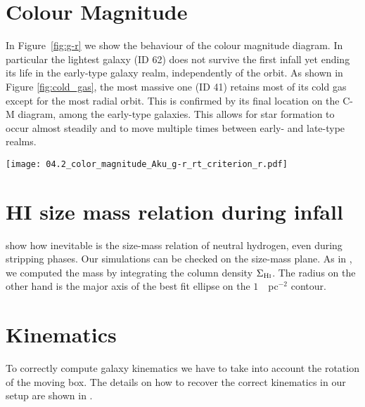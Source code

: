 \section{Colour Magnitude}
In Figure~\ref{fig:g-r} we show the behaviour of the colour magnitude diagram.
In particular the lightest galaxy (ID 62) does not survive the first infall yet ending its life in the early-type galaxy realm, independently of the orbit.
As shown in Figure \ref{fig:cold_gas}, the most massive one (ID 41) retains most of its cold gas except for the most radial orbit.
This is confirmed by its final location on the C-M diagram, among the early-type galaxies.
This allows for star formation to occur almost steadily and to move multiple times between early- and late-type realms.


\begin{sidewaysfigure}
\centering
\texttt{[image: 04.2\_color\_magnitude\_Aku\_g-r\_rt\_criterion\_r.pdf]}
\caption{SDSS bands colour magnitude diagram of galaxies on different orbits compared to Fornax dwarf catalogue of \citet{Venhola2019}.
Red and blue colour for the data points in the background represent dwarf elliptical (dE) and late type galaxy respectively, classified by eye on the base of morphology.
Empty squares are nucleated dE.
Data tracks of simulated galaxies are shown overlaid colour coded by the clustercentric radius.
The tracks are limited to bound galaxies i.e. they are drawn with snapshots for which condition \eqref{eq:tidal_radius_condition} holds.
}
\label{fig:g-r}
\end{sidewaysfigure}

\section{HI size mass relation during infall}
\citet{Stevens2019} show how inevitable is the size-mass relation of neutral hydrogen, even during stripping phases.
Our simulations can be checked on the size-mass plane.
As in \citet{Verbeke2017}, we computed the \Hi{} mass by integrating the \Hi{} column density $\Sigma_{\text{H\textsc{i}}}$. The radius on the other hand is the major axis of the best fit ellipse on the $1$~\Msun{}~pc$^{-2}$ contour.


\section{Kinematics}
To correctly compute galaxy kinematics we have to take into account the rotation of the moving box.
The details on how to recover the correct kinematics in our setup are shown in .

